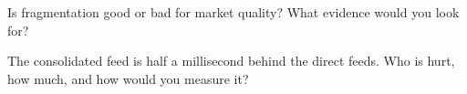 \begin{interviewq}\label{iq:mx:fragmentation-and-routing:5}
Is fragmentation good or bad for market quality? What evidence would you look for?
\end{interviewq}

\begin{interviewq}\label{iq:mx:fragmentation-and-routing:6}
The consolidated feed is half a millisecond behind the direct feeds. Who is hurt, how much, and how would you measure it?
\end{interviewq}
